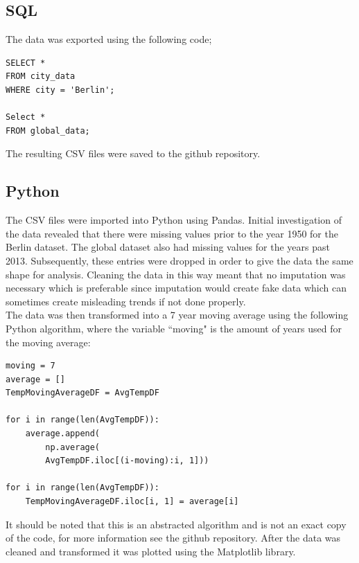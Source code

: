 \documentclass[journal, a4paper]{IEEEtran}
\begin{document}
    \subsection{SQL}
    
    The data was exported using the following code;
    
    \begin{small}
    \begin{lstlisting}
SELECT *
FROM city_data
WHERE city = 'Berlin';
    
Select *
FROM global_data;
    \end{lstlisting}
    \end{small}
    
    The resulting CSV files were saved to the github repository.
    
    \subsection{Python}
    
    The CSV files were imported into Python using Pandas. Initial investigation of the data revealed that there were missing values prior to the year 1950 for the Berlin dataset. The global dataset also had missing values for the years past 2013. Subsequently, these entries were dropped in order to give the data the same shape for analysis. Cleaning the data in this way meant that no imputation was necessary which is preferable since imputation would create fake data which can sometimes create misleading trends if not done properly.\\
    
    The data was then transformed into a 7 year moving average using the following Python algorithm, where the variable ``moving" is the amount of years used for the moving average:
    
    \begin{small}
    \begin{lstlisting}
moving = 7
average = []
TempMovingAverageDF = AvgTempDF

for i in range(len(AvgTempDF)):
    average.append(
    	np.average(
        AvgTempDF.iloc[(i-moving):i, 1]))
    
for i in range(len(AvgTempDF)):   
	TempMovingAverageDF.iloc[i, 1] = average[i]
    \end{lstlisting}
    \end{small}
    
    It should be noted that this is an abstracted algorithm and is not an exact copy of the code, for more information see the github repository. After the data was cleaned and transformed it was plotted using the Matplotlib library.
    
\end{document}
